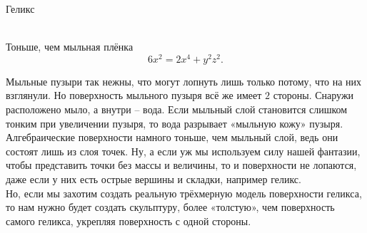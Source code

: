 \documentclass[ru]{./../../common/SurferDesc}%
\begin{document}
\footnotesize


\begin{surferPage}
  \begin{surferTitle}Геликс\end{surferTitle}   \\
Тоньше, чем мыльная плёнка\\
  \smallskip
\[6x^2	= 2x^4	+ y^2	z^2.\]

\singlespacing
Мыльные пузыри так нежны, что могут лопнуть лишь только потому, что на них взглянули. Но поверхность мыльного пузыря всё же имеет $2$ стороны. Снаружи расположено мыло, а внутри – вода. Если мыльный слой становится слишком тонким при увеличении пузыря, то вода разрывает «мыльную кожу» пузыря. \\
\vspace{0,3cm}
Алгебраические поверхности намного тоньше, чем мыльный слой, ведь они состоят лишь из слоя точек. Ну, а если уж мы используем силу нашей фантазии, чтобы представить точки без массы и величины, то и поверхности не лопаются, даже если у них есть острые вершины и складки, например геликс.\\
\vspace{0,3cm}
Но, если мы захотим создать реальную трёхмерную модель поверхности геликса, то нам нужно будет создать скульптуру, более «толстую», чем поверхность самого геликса, укрепляя поверхность с одной стороны.

  \begin{surferText}
     \end{surferText}
\end{surferPage}



 
\end{document}
